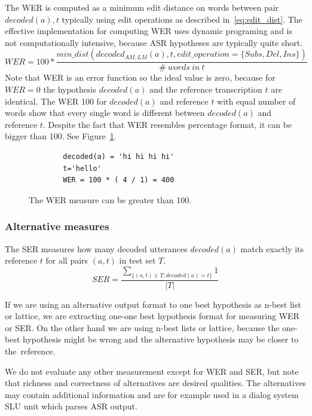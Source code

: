 {The \ac{WER} is computed as a minimum edit distance on words between 
pair $decoded(a), t$ typically using edit operations  as described in~\ref{eq:edit_dist}.
The effective implementation for computing WER uses dynamic programing and is not computationally intensive,
because \ac{ASR} hypotheses are typically quite short.
\begin{equation} \label{eq:edit_dist}
    WER = 100* \frac{min\_dist(decoded_{AM, LM}(a), t, edit\_operation=\{Subs, Del, Ins\})}{\#\ words\ in\ t}
\end{equation}
Note that \ac{WER} is an error function so the ideal value is zero, because for $WER=0$ the hypothesis $decoded(a)$ and 
the reference transcription $t$ are identical. The \ac{WER} 100 for $decoded(a)$ and reference $t$ 
with equal number of words show that every single word is different between $decoded(a)$ and reference $t$.
Despite the fact that \ac{WER} resembles percentage format, it can be bigger than 100. See Figure~\ref{fig:wer400}.
\begin{figure}[!htp]
    \begin{center}
    \begin{verbatim}
        decoded(a) = 'hi hi hi hi'
        t='hello'
        WER = 100 * ( 4 / 1) = 400
    \end{verbatim}
    \caption{The \acs{WER} measure can be greater than 100.}
    \label{fig:wer400} 
    \end{center}
\end{figure}

\subsubsection*{Alternative measures}
The \acl{SER} measures how many decoded utterances $decoded(a)$ match exactly its reference $t$
for all pairs $(a, t)$ in test set $T$.
\begin{equation}
    SER = \frac{\sum_{\{(a, t) \in T; decoded(a) = t\}}{1}}{|T|}
\end{equation}

If we are using an alternative output format to one best hypothesis as n-best list or lattice,
we are extracting one-one best hypothesis format for measuring \ac{WER} or \ac{SER}.
On the other hand we are using n-best lists or lattice,
because the one-best hypothesis might be wrong and the alternative
hypothesis may be closer to the~reference.

We do not evaluate any other measurement except for \ac{WER} and \ac{SER},
but note that richness and correctness of alternatives are desired qualities.
The alternatives may contain additional information and are for example used
in a dialog system \acl{SLU} unit which parses \ac{ASR} output.

}
